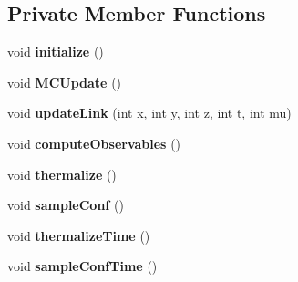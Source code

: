 \subsection*{Private Member Functions}
\begin{DoxyCompactItemize}
\item 
void {\bfseries initialize} ()\hypertarget{classGaugeFieldFactory_a3b7b0bc33811c149c85b595f5c724ddb}{}\label{classGaugeFieldFactory_a3b7b0bc33811c149c85b595f5c724ddb}

\item 
void {\bfseries M\+C\+Update} ()\hypertarget{classGaugeFieldFactory_a23a45078029941f5e5dd2d699935d38b}{}\label{classGaugeFieldFactory_a23a45078029941f5e5dd2d699935d38b}

\item 
void {\bfseries update\+Link} (int x, int y, int z, int t, int mu)\hypertarget{classGaugeFieldFactory_ac58103157c9d39daa4819e2f9e8b7024}{}\label{classGaugeFieldFactory_ac58103157c9d39daa4819e2f9e8b7024}

\item 
void {\bfseries compute\+Observables} ()\hypertarget{classGaugeFieldFactory_a70fc0cc23088b190f35c56885762812a}{}\label{classGaugeFieldFactory_a70fc0cc23088b190f35c56885762812a}

\item 
void {\bfseries thermalize} ()\hypertarget{classGaugeFieldFactory_a18bc263a1dac26f0147063c33e33a518}{}\label{classGaugeFieldFactory_a18bc263a1dac26f0147063c33e33a518}

\item 
void {\bfseries sample\+Conf} ()\hypertarget{classGaugeFieldFactory_a37df236572b4c1adf1a00d3d1374621a}{}\label{classGaugeFieldFactory_a37df236572b4c1adf1a00d3d1374621a}

\item 
void {\bfseries thermalize\+Time} ()\hypertarget{classGaugeFieldFactory_aaacc047577bbb5d0fcb790525d8ff958}{}\label{classGaugeFieldFactory_aaacc047577bbb5d0fcb790525d8ff958}

\item 
void {\bfseries sample\+Conf\+Time} ()\hypertarget{classGaugeFieldFactory_adc5d83defde9295cdc32c9c4ec59af59}{}\label{classGaugeFieldFactory_adc5d83defde9295cdc32c9c4ec59af59}

\end{DoxyCompactItemize}
